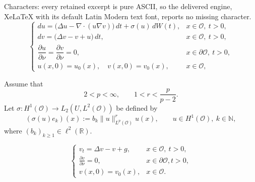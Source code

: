 \documentclass[10pt,a4paper]{amsart}
\begin{document}
Characters: every retained excerpt is pure ASCII, so the delivered engine, XeLaTeX with its default Latin Modern text font, reports no missing character.
\begin{equation}\label{equ1}
\begin{cases}
du = \big(\Delta u-\nabla\cdot(u\nabla v)\big)\,dt+\sigma(u)\,dW(t),
& x\in\mathcal{O},\ t>0,\\
dv = \big(\Delta v-v+u\big)\,dt,
& x\in\mathcal{O},\ t>0,\\
\dfrac{\partial u}{\partial \nu}
=
\dfrac{\partial v}{\partial \nu}
=0,
& x\in\partial\mathcal{O},\ t>0,\\
u(x,0)=u_0(x),\quad v(x,0)=v_0(x),
& x\in\mathcal{O},
\end{cases}
\end{equation}

\begin{assumption}\label{ass}
Assume that
\[
2< p<\infty,
\qquad
1<r<\frac{p}{p-2}.
\]
Let $\sigma:H^1(\mathcal O)\to L_2(U,L^2(\mathcal O))$
be defined by
\[
(\sigma(u)e_k)(x):=b_k\|u\|_{L^p(\mathcal O)}^{r}u(x),
\qquad u\in H^1(\mathcal O),\ k\in\mathbb N,
\]
where $(b_k)_{k\ge1}\in \ell^2(\mathbb R).$
\end{assumption}

\begin{equation}\label{equ-v_t}
\begin{cases}
v_t=\Delta v-v+g, & x\in\mathcal {O},\ t>0, \\\frac{\partial v}{\partial \nu} = 0,&x\in\partial\mathcal{O},t> 0,\\
v(x,0)=v_0(x), & x\in\mathcal {O}.
\end{cases}
\end{equation}
\end{document}

